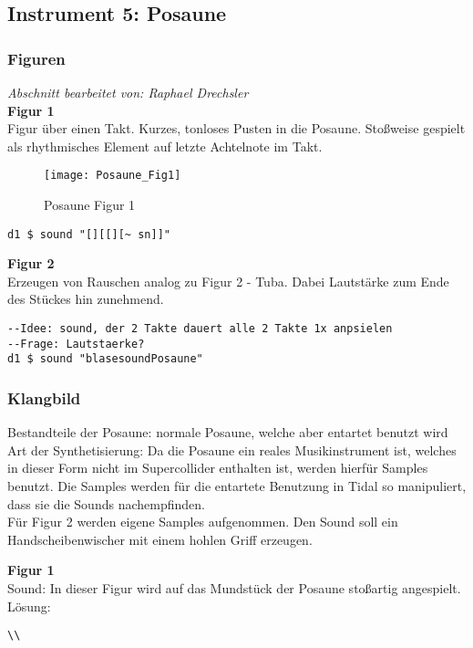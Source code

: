 \documentclass[
10pt, %
a4paper, %
oneside, %
headinclude,footinclude, %
BCOR5mm, %
]{scrartcl}
\begin{document}
\subsection{Instrument 5: Posaune}
\subsubsection{Figuren}
\textit{Abschnitt bearbeitet von: Raphael Drechsler}\\

\noindent\textbf{Figur 1}\\
Figur über einen Takt. Kurzes, tonloses Pusten in die Posaune. Stoßweise gespielt als rhythmisches Element auf letzte Achtelnote im Takt.\\
\begin{figure}[h]
	\centering 
	\texttt{[image: Posaune\_Fig1]} 
	\caption{Posaune Figur 1}
\end{figure}

\begin{lstlisting}
d1 $ sound "[][[][~ sn]]"
\end{lstlisting}


\noindent\textbf{Figur 2}\\
Erzeugen von Rauschen analog zu Figur 2 - Tuba. Dabei Lautstärke zum Ende des Stückes hin zunehmend.
\begin{lstlisting}
--Idee: sound, der 2 Takte dauert alle 2 Takte 1x anpsielen
--Frage: Lautstaerke?
d1 $ sound "blasesoundPosaune"
\end{lstlisting}

\subsubsection{Klangbild}
Bestandteile der Posaune: normale Posaune, welche aber entartet benutzt wird\\
Art der Synthetisierung: Da die Posaune ein reales Musikinstrument ist, welches in dieser Form nicht im Supercollider enthalten ist,
werden hierfür Samples benutzt. Die Samples werden für die entartete Benutzung in Tidal so manipuliert, dass sie die Sounds
nachempfinden.\\
Für Figur 2 werden eigene Samples aufgenommen. Den Sound soll ein Handscheibenwischer mit einem hohlen Griff erzeugen.

\noindent\textbf{Figur 1}\\
 Sound: In dieser Figur wird auf das Mundstück der Posaune stoßartig angespielt.\\
Lösung:\\
\begin{lstlisting}
\\
\end{lstlisting}
\end{document}
